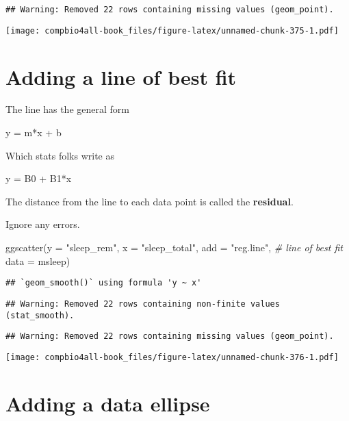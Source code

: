 \documentclass[
]{book}
\newenvironment{Shaded}{\begin{snugshade}}{\end{snugshade}}
\newcommand{\AttributeTok}[1]{\textcolor[rgb]{0.77,0.63,0.00}{#1}}
\newcommand{\CommentTok}[1]{\textcolor[rgb]{0.56,0.35,0.01}{\textit{#1}}}
\newcommand{\FunctionTok}[1]{\textcolor[rgb]{0.00,0.00,0.00}{#1}}
\newcommand{\NormalTok}[1]{#1}
\newcommand{\StringTok}[1]{\textcolor[rgb]{0.31,0.60,0.02}{#1}}
\begin{document}
\begin{verbatim}
## Warning: Removed 22 rows containing missing values (geom_point).
\end{verbatim}

\texttt{[image: compbio4all-book\_files/figure-latex/unnamed-chunk-375-1.pdf]}

\hypertarget{adding-a-line-of-best-fit-2}{%
\section{Adding a line of best fit}\label{adding-a-line-of-best-fit-2}}

The line has the general form

y = m*x + b

Which stats folks write as

y = B0 + B1*x

The distance from the line to each data point is called the \textbf{residual}.

Ignore any errors.

\begin{Shaded}
\begin{Highlighting}[]
\FunctionTok{ggscatter}\NormalTok{(}\AttributeTok{y =} \StringTok{"sleep\_rem"}\NormalTok{,}
          \AttributeTok{x =} \StringTok{"sleep\_total"}\NormalTok{,}
          \AttributeTok{add =} \StringTok{"reg.line"}\NormalTok{,  }\CommentTok{\# line of best fit}
          \AttributeTok{data =}\NormalTok{ msleep)}
\end{Highlighting}
\end{Shaded}

\begin{verbatim}
## `geom_smooth()` using formula 'y ~ x'
\end{verbatim}

\begin{verbatim}
## Warning: Removed 22 rows containing non-finite values (stat_smooth).
\end{verbatim}

\begin{verbatim}
## Warning: Removed 22 rows containing missing values (geom_point).
\end{verbatim}

\texttt{[image: compbio4all-book\_files/figure-latex/unnamed-chunk-376-1.pdf]}

\hypertarget{adding-a-data-ellipse-2}{%
\section{Adding a data ellipse}\label{adding-a-data-ellipse-2}}
\end{document}

